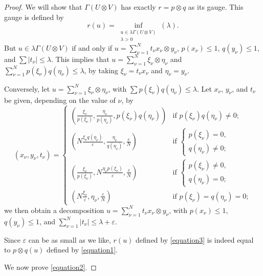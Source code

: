 \documentclass{article}
\theoremstyle{plain}
\theoremstyle{definition}
\renewcommand{\leq}{\leqslant}
\newcommand{\oldpage}[1]{\marginpar{\phantom{.}\\\footnotesize$\Big\vert$ \textit{p.~#1}}}
\begin{document}
\begin{proof}
\oldpage{4}
  We will show that $\Gamma(U\otimes V)$ has exactly $r=p\otimes q$ as its gauge.
  This gauge is defined by
  \[
  \label{equation3}
    r(u) = \inf_{\substack{u\in\lambda\Gamma(U\otimes V)\\\lambda>0}}(\lambda).
  \tag{3}
  \]
  But $u\in\lambda\Gamma(U\otimes V)$ if and only if $u=\sum_{\nu=1}^N t_\nu x_\nu \otimes y_\nu$, $p(x_\nu)\leq1$, $q(y_\nu)\leq1$, and $\sum|t_\nu|\leq\lambda$.
  This implies that $u=\sum_{\nu=1}^N\xi_\nu\otimes\eta_\nu$ and $\sum_{\nu=1}^N p(\xi_\nu)q(\eta_\nu)\leq\lambda$, by taking $\xi_\nu=t_\nu x_\nu$ and $\eta_\nu=y_\nu$.

  Conversely, let $u=\sum_{\nu=1}^N \xi_\nu\otimes\eta_\nu$, with $\sum p(\xi_\nu)q(\eta_\nu)\leq\lambda$.
  Let $x_\nu$, $y_\nu$, and $t_\nu$ be given, depending on the value of $\nu$, by
  \[
    (x_\nu,y_\nu,t_\nu) =
    \begin{cases}
      \left(
        \frac{\xi_\nu}{p(\xi_\nu)}, \frac{\eta_\nu}{p(\eta_\nu)}, p(\xi_\nu)q(\eta_\nu)
      \right) &\mbox{if }
      p(\xi_\nu)q(\eta_\nu)\neq0;
    \\\left(
        N\frac{\xi_\nu q(\eta_\nu)}{\varepsilon}, \frac{\eta_\nu}{q(\eta_\nu)}, \frac{\varepsilon}{N}
      \right) &\mbox{if }
      \begin{cases}
        p(\xi_\nu)=0,
      \\q(\eta_\nu)\neq0;
      \end{cases}
    \\\left(
        \frac{\xi_\nu}{p(\xi_\nu)}, N\frac{\eta_\nu p(\xi_\nu)}{\varepsilon}, \frac{\varepsilon}{N}
      \right) &\mbox{if }
      \begin{cases}
        p(\xi_\nu)\neq0,
      \\q(\eta_\nu)=0;
      \end{cases}
    \\\left(
        N\frac{\xi_\nu}{\varepsilon}, \eta_\nu, \frac{\varepsilon}{N}
      \right) &\mbox{if }
      p(\xi_\nu) = q(\eta_\nu) = 0;
    \end{cases}
  \]
  we then obtain a decomposition $u=\sum_{\nu=1}^N t_\nu x_\nu\otimes y_\nu$, with $p(x_\nu)\leq1$, $q(y_\nu)\leq1$, and $\sum_{\nu=1}^N|t_\nu|\leq\lambda+\varepsilon$.

  Since $\varepsilon$ can be as small as we like, $r(u)$ defined by \cref{equation3} is indeed equal to $p\otimes q(u)$ defined by \cref{equation1}.

  We now prove \cref{equation2}.
\end{proof}
\end{document}
